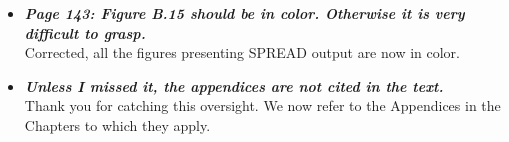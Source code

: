 \documentclass[english]{article}
\begin{document}
\begin{itemize}
\item {
{\it
\textbf{
Page 143: Figure B.15 should be in color. 
Otherwise it is very difficult to grasp.
}%
}%
}%
\\
Corrected, all the figures presenting SPREAD output are now in color.




\item {
{\it
\textbf{
Unless I missed it, the appendices are not cited in the text.
}%
}%
}%
\\
Thank you for catching this oversight. We now refer to the Appendices in the Chapters to which they apply.


\end{itemize}







\end{document}
